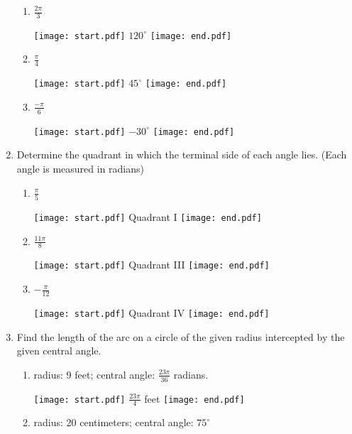 \documentclass[12pt]{article}
\begin{document}
\begin{enumerate}
\begin{enumerate}
\item $\displaystyle \frac{2\pi}{3}$

\texttt{[image: start.pdf]}
{$\displaystyle 120^{\circ}$}
\texttt{[image: end.pdf]}


\item $\displaystyle \frac{\pi}{4}$

\texttt{[image: start.pdf]}
{$\displaystyle 45^{\circ}$}
\texttt{[image: end.pdf]}


\item $\displaystyle \frac{-\pi}{6}$

\texttt{[image: start.pdf]}
{$\displaystyle -30^{\circ}$}
\texttt{[image: end.pdf]}


\end{enumerate}

\item Determine the quadrant in which the terminal side of each angle lies. \newline (Each angle is measured in radians)

\begin{enumerate}

\item $\displaystyle \frac{\pi}{5}$

\texttt{[image: start.pdf]}
{Quadrant I}
\texttt{[image: end.pdf]}


\item $\displaystyle \frac{11\pi}{8}$

\texttt{[image: start.pdf]}
{Quadrant III}
\texttt{[image: end.pdf]}


\item $\displaystyle -\frac{\pi}{12}$

\texttt{[image: start.pdf]}
{Quadrant IV}
\texttt{[image: end.pdf]}


\end{enumerate}

\item Find the length of the arc on a circle of the given radius intercepted by the given central angle.  

\begin{enumerate}

\item radius: 9 feet; central angle: $\frac{23\pi}{36}$ radians.

\texttt{[image: start.pdf]}
{$\displaystyle \frac{23\pi}{4}$ feet}
\texttt{[image: end.pdf]}


\item radius: 20 centimeters; central angle: $75^{\circ}$


\end{enumerate}
\end{enumerate}
\end{document}
